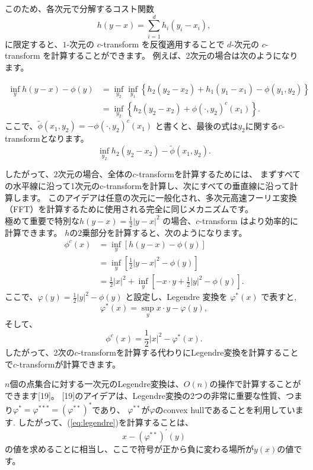 \documentclass{jsarticle}
\theoremstyle{definition}
\begin{document}
このため、各次元で分解するコスト関数 
$$
h(y-x) = \sum_{i = 1}^{d}  h_i(y_i - x_i),
$$ に限定すると、$1$-次元の $c$-transform を反復適用することで $d$-次元の $c$-transform を計算することができます。
例えば、2次元の場合は次のようになります。

\begin{align*}
  \inf_y h(y - x) - \phi(y) &= \inf_{y_2} \inf_{y_1} \left\{ h_2(y_2 - x_2) + h_1(y_1 - x_1) - \phi(y_1, y_2) \right\}  \\
                            &= \inf_{y_2} \left\{ h_2(y_2 - x_2) + \phi(\cdot, y_2)^c(x_1) \right\}.
\end{align*}
ここで、$\tilde{\phi}(x_1, y_2) = -\phi(\cdot, y_2)^c(x_1)$ と書くと、最後の式は$y_2$に関する$c$-transformとなります。
$$
  \inf_{y_2} h_2(y_2 - x_2) - \tilde{\phi}(x_1, y_2).
$$

したがって、$2$次元の場合、全体の$c$-transformを計算するためには、
まずすべての水平線に沿って1次元のc-transformを計算し、次にすべての垂直線に沿って計算します。
このアイデアは任意の次元に一般化され、多次元高速フーリエ変換（FFT）を計算するために使用される完全に同じメカニズムです。\\

極めて重要で特別な$h(y-x)=\frac{1}{2}|y-x|^2$ の場合、$c$-transform はより効率的に計算できます。
$h$の2乗部分を計算すると、次のようになります。
\begin{align*}
  \phi^c(x) &= \inf_y \left[h(y - x) - \phi(y) \right]\\
            &= \inf_y \left[\frac{1}{2}|y-x|^2 - \phi(y) \right]\\
            &=\frac{1}{2}|x|^2+\inf_y\left[-x\cdot y+\frac{1}{2}|y|^2-\phi(y)\right].
\end{align*}
ここで、$\varphi(y)=\frac{1}{2}|y|^2-\phi(y)$ と設定し、Legendre 変換を $\varphi^*(x)$ で表すと,
\begin{equation}
  \label{eq:legendre}
  \varphi^*(x)=\sup_y x\cdot y-\varphi(y),
\end{equation}
そして、
$$\phi^c(x)=\frac{1}{2}|x|^2-\varphi^*(x).$$
したがって、2次の$c$-transformを計算する代わりにLegendre変換を計算することで$c$-transformが計算できます。

$n$個の点集合に対する一次元のLegendre変換は、$O(n)$の操作で計算することができます[19]。
[19]のアイデアは、Legendre変換の2つの非常に重要な性質、つまり$\varphi^* = \varphi^{***} = (\varphi^{**})^*$であり、
$\varphi^{**}$が$\varphi$のconvex hullであることを利用しています.
したがって、(\ref{eq:legendre})を計算することは、
\begin{equation}
  x - (\varphi^{**})^\prime(y)
\end{equation}
の値を求めることに相当し、ここで符号が正から負に変わる場所が$y(x)$の値です。
\end{document}
